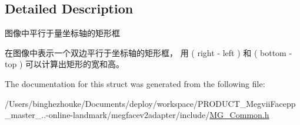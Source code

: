 \subsection{Detailed Description}
图像中平行于量坐标轴的矩形框 

在图像中表示一个双边平行于坐标轴的矩形框， 用 ( right -\/ left ) 和 ( bottom -\/ top ) 可以计算出矩形的宽和高。 

The documentation for this struct was generated from the following file\+:\begin{DoxyCompactItemize}
\item 
/\+Users/binghezhouke/\+Documents/deploy/workspace/\+P\+R\+O\+D\+U\+C\+T\+\_\+\+Megvii\+Facepp\+\_\+master\+\_..-\/online-\/landmark/megfacev2adapter/include/\hyperlink{_m_g___common_8h}{M\+G\+\_\+\+Common.\+h}\end{DoxyCompactItemize}

